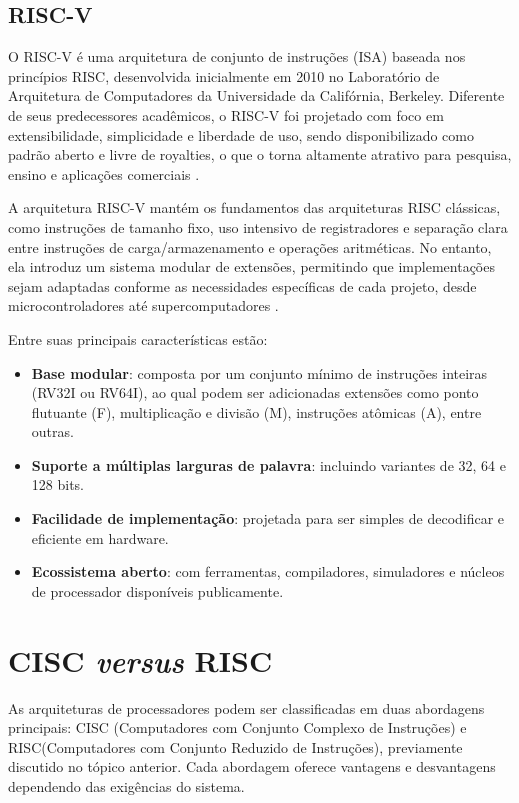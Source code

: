 \documentclass[
	12pt,				%
	openright,			%
	oneside,			%
	a4paper,			%
	english,			%
	french,				%
	spanish,			%
	brazil,				%
	]{abntex2}
\begin{document}
\subsection{RISC-V}

O RISC-V é uma arquitetura de conjunto de instruções (ISA) baseada nos princípios RISC, desenvolvida inicialmente em 2010 no Laboratório de Arquitetura de Computadores da Universidade da Califórnia, Berkeley. Diferente de seus predecessores acadêmicos, o RISC-V foi projetado com foco em extensibilidade, simplicidade e liberdade de uso, sendo disponibilizado como padrão aberto e livre de royalties, o que o torna altamente atrativo para pesquisa, ensino e aplicações comerciais \cite[p.1]{patterson_risc-v_2016}.

A arquitetura RISC-V mantém os fundamentos das arquiteturas RISC clássicas, como instruções de tamanho fixo, uso intensivo de registradores e separação clara entre instruções de carga/armazenamento e operações aritméticas. No entanto, ela introduz um sistema modular de extensões, permitindo que implementações sejam adaptadas conforme as necessidades específicas de cada projeto, desde microcontroladores até supercomputadores \cite{risc-v_risc-v_2024}.

Entre suas principais características estão:
\begin{itemize}
    \item \textbf{Base modular}: composta por um conjunto mínimo de instruções inteiras (RV32I ou RV64I), ao qual podem ser adicionadas extensões como ponto flutuante (F), multiplicação e divisão (M), instruções atômicas (A), entre outras.
    \item \textbf{Suporte a múltiplas larguras de palavra}: incluindo variantes de 32, 64 e 128 bits.
    \item \textbf{Facilidade de implementação}: projetada para ser simples de decodificar e eficiente em hardware.
    \item \textbf{Ecossistema aberto}: com ferramentas, compiladores, simuladores e núcleos de processador disponíveis publicamente.
\end{itemize}

\section{CISC \textit{versus} RISC}
As arquiteturas de processadores podem ser classificadas em duas abordagens principais: CISC (Computadores com Conjunto Complexo de Instruções) e RISC(Computadores com Conjunto Reduzido de Instruções)\cite[p.19]{catsoulis_designing_2002}, previamente discutido no tópico anterior. Cada abordagem oferece vantagens e desvantagens dependendo das exigências do sistema.
\end{document}
